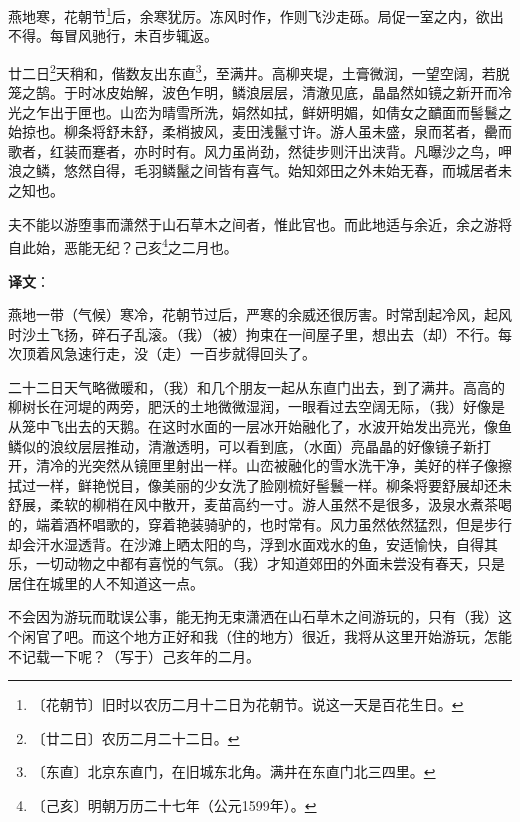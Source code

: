 \documentclass[12pt,UTF-8,openany,a4]{ctexbook}
\begin{document}
\begin{large}
    
    燕地寒，花朝节\footnote{〔花朝节〕\yiwen 旧时以农历二月十二日为花朝节。说这一天是百花生日。}后，余寒犹厉。冻风时作，作则飞沙走砾。局促一室之内，欲出不得。每冒风驰行，未百步辄返。
    
    廿二日\footnote{〔廿二日〕\yiwen 农历二月二十二日。}天稍和，偕数友出东直\footnote{〔东直〕\yiwen 北京东直门，在旧城东北角。满井在东直门北三四里。}，至满井。高柳夹堤，土膏微润，一望空阔，若脱笼之鹄。于时冰皮始解，波色乍明，鳞浪层层，清澈见底，晶晶然如镜之新开而冷光之乍出于匣也。山峦为晴雪所洗，娟然如拭，鲜妍明媚，如倩女之靧面而髻鬟之始掠也。柳条将舒未舒，柔梢披风，麦田浅鬣寸许。游人虽未盛，泉而茗者，罍而歌者，红装而蹇者，亦时时有。风力虽尚劲，然徒步则汗出浃背。凡曝沙之鸟，呷浪之鳞，悠然自得，毛羽鳞鬣之间皆有喜气。始知郊田之外未始无春，而城居者未之知也。
    
    夫不能以游堕事而潇然于山石草木之间者，惟此官也。而此地适与余近，余之游将自此始，恶能无纪？己亥\footnote{〔己亥〕\yiwen 明朝万历二十七年（公元1599年）。}之二月也。

\end{large}


\newpage

\begin{Large}
   \noindent \textbf{译文}：
\end{Large}

\vspace{1em}

\begin{large}\yiwen
    
    燕地一带（气候）寒冷，花朝节过后，严寒的余威还很厉害。时常刮起冷风，起风时沙土飞扬，碎石子乱滚。（我）（被）拘束在一间屋子里，想出去（却）不行。每次顶着风急速行走，没（走）一百步就得回头了。
    
    二十二日天气略微暖和，（我）和几个朋友一起从东直门出去，到了满井。高高的柳树长在河堤的两旁，肥沃的土地微微湿润，一眼看过去空阔无际，（我）好像是从笼中飞出去的天鹅。在这时水面的一层冰开始融化了，水波开始发出亮光，像鱼鳞似的浪纹层层推动，清澈透明，可以看到底，（水面）亮晶晶的好像镜子新打开，清冷的光突然从镜匣里射出一样。山峦被融化的雪水洗干净，美好的样子像擦拭过一样，鲜艳悦目，像美丽的少女洗了脸刚梳好髻鬟一样。柳条将要舒展却还未舒展，柔软的柳梢在风中散开，麦苗高约一寸。游人虽然不是很多，汲泉水煮茶喝的，端着酒杯唱歌的，穿着艳装骑驴的，也时常有。风力虽然依然猛烈，但是步行却会汗水湿透背。在沙滩上晒太阳的鸟，浮到水面戏水的鱼，安适愉快，自得其乐，一切动物之中都有喜悦的气氛。（我）才知道郊田的外面未尝没有春天，只是居住在城里的人不知道这一点。
    
    不会因为游玩而耽误公事，能无拘无束潇洒在山石草木之间游玩的，只有（我）这个闲官了吧。而这个地方正好和我（住的地方）很近，我将从这里开始游玩，怎能不记载一下呢？（写于）己亥年的二月。
    

\end{large}
\end{document}
